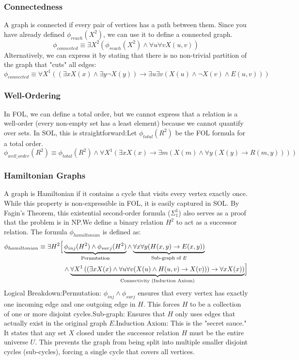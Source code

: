 \documentclass{article}
\begin{document}
\subsubsection{Connectedness}A graph is connected if every pair of vertices has a path between them. Since you have already defined $\phi_{reach}(X^2)$, we can use it to define a connected graph.$$\phi_{connected} \equiv \exists X^2 (\phi_{reach}(X^2) \land \forall u \forall v X(u, v))$$Alternatively, we can express it by stating that there is no non-trivial partition of the graph that "cuts" all edges:$$\phi_{connected} \equiv \forall X^1 ((\exists x X(x) \land \exists y \neg X(y)) \rightarrow \exists u \exists v (X(u) \land \neg X(v) \land E(u, v)))$$


\subsubsection{Well-Ordering}In FOL, we can define a total order, but we cannot express that a relation is a well-order (every non-empty set has a least element) because we cannot quantify over sets. In SOL, this is straightforward:Let $\phi_{total}(R^2)$ be the FOL formula for a total order.$$\phi_{well\_order}(R^2) \equiv \phi_{total}(R^2) \land \forall X^1 (\exists x X(x) \rightarrow \exists m (X(m) \land \forall y (X(y) \rightarrow R(m, y))))$$

\subsubsection{Hamiltonian Graphs}A graph is Hamiltonian if it contains a cycle that visits every vertex exactly once. While this property is non-expressible in FOL, it is easily captured in SOL. By Fagin's Theorem, this existential second-order formula ($\Sigma^1_1$) also serves as a proof that the problem is in NP.We define a binary relation $H^2$ to act as a successor relation. The formula $\phi_{hamiltonian}$ is defined as:$$\begin{aligned}
\phi_{hamiltonian} \equiv \exists H^2 \Bigl[ & \underbrace{\phi_{inj}(H^2) \land \phi_{surj}(H^2)}_{\text{Permutation}} \land \underbrace{\forall x\forall y (H(x, y) \rightarrow E(x, y))}_{\text{Sub-graph of } E} \\
& \land \underbrace{\forall X^1 \left( \left( \exists x X(x) \land \forall u\forall v (X(u) \land H(u, v) \rightarrow X(v)) \right) \rightarrow \forall x X(x) \right)}_{\text{Connectivity (Induction Axiom)}} \Bigr]
\end{aligned}$$Logical Breakdown:Permutation: $\phi_{inj} \land \phi_{surj}$ ensures that every vertex has exactly one incoming edge and one outgoing edge in $H$. This forces $H$ to be a collection of one or more disjoint cycles.Sub-graph: Ensures that $H$ only uses edges that actually exist in the original graph $E$.Induction Axiom: This is the "secret sauce." It states that any set $X$ closed under the successor relation $H$ must be the entire universe $U$. This prevents the graph from being split into multiple smaller disjoint cycles (sub-cycles), forcing a single cycle that covers all vertices.
\end{document}
